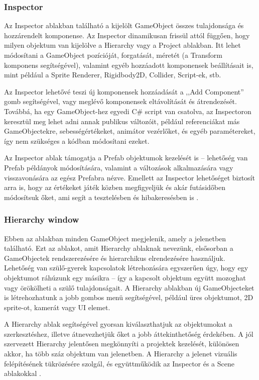 \documentclass[
]{thesis-ekf}
\theoremstyle{definition}
\theoremstyle{remark}
\begin{document}
\subsubsection{Inspector}
Az Inspector ablakban található a kijelölt GameObject összes tulajdonsága és hozzárendelt komponense. Az Inspector dinamikusan frissül attól függően, hogy milyen objektum van kijelölve a Hierarchy vagy a Project ablakban. Itt lehet módosítani a GameObject pozícióját, forgatását, méretét (a Transform komponens segítségével), valamint egyéb hozzáadott komponensek beállításait is, mint például a Sprite Renderer, Rigidbody2D, Collider, Script-ek, stb.

Az Inspector lehetővé teszi új komponensek hozzáadását a ,,Add Component'' gomb segítségével, vagy meglévő komponensek eltávolítását és átrendezését. Továbbá, ha egy GameObject-hez egyedi C\# script van csatolva, az Inspectoron keresztül meg lehet adni annak publikus változóit, például referenciákat más GameObjectekre, sebességértékeket, animátor vezérlőket, és egyéb paramétereket, így nem szükséges a kódban módosítani ezeket.

Az Inspector ablak támogatja a Prefab objektumok kezelését is – lehetőség van Prefab példányok módosítására, valamint a változások alkalmazására vagy visszavonására az egész Prefabra nézve. Emellett az Inspector lehetőséget biztosít arra is, hogy az értékeket játék közben megfigyeljük és akár futásidőben módosítsuk őket, ami segít a tesztelésben és hibakeresésben is \cite{UnityIspector}.

\subsubsection{Hierarchy window}
Ebben az ablakban minden GameObject megjelenik, amely a jelenetben található. Ezt az ablakot, amit Hierarchy ablaknak nevezünk, elsősorban a GameObjectek rendszerezésére és hierarchikus elrendezésére használjuk. Lehetőség van szülő-gyerek kapcsolatok létrehozására egyszerűen úgy, hogy egy objektumot ráhúzunk egy másikra – így a kapcsolt objektum együtt mozoghat vagy örökölheti a szülő tulajdonságait. A Hierarchy ablakban új GameObjecteket is létrehozhatunk a jobb gombos menü segítségével, például üres objektumot, 2D sprite-ot, kamerát vagy UI elemet.

A Hierarchy ablak segítségével gyorsan kiválaszthatjuk az objektumokat a szerkesztéshez, illetve átnevezhetjük őket a jobb áttekinthetőség érdekében. A jól szervezett Hierarchy jelentősen megkönnyíti a projektek kezelését, különösen akkor, ha több száz objektum van jelenetben. A Hierarchy a jelenet vizuális felépítésének tükrözésére szolgál, és együttműködik az Inspector és a Scene ablakokkal \cite{UnityIspector}.
\end{document}
